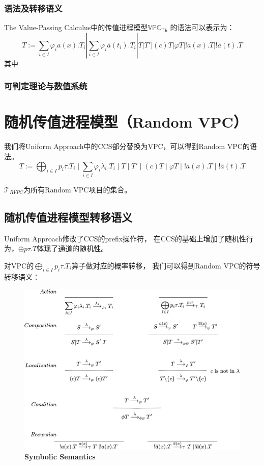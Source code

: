\subsubsection{语法及转移语义}
The Value-Passing Calculus中的传值进程模型$\mathbb{VPC}_{\mathsf{Th}}$
的语法可以表示为：
$$T:=\sum_{i\in I}\varphi_i a(x).T_i|\sum_{i\in I}\varphi_i\overline{a}(t_i).T_i|T|T'|(c)T|\varphi T|!a(x).T|!\overline{a}(t).T$$
其中
\subsubsection{可判定理论与数值系统}

\section{随机传值进程模型（Random VPC）}
我们将Uniform Approach中的CCS部分替换为VPC，可以得到Random VPC的语法。
$$T:=\bigoplus_{i\in I}p_i \tau.T_i\mid \sum_{i\in I} \varphi_i\lambda_i.T_i\mid T \mid T'\mid (c)T\mid \varphi T\mid !a(x).T \mid !\bar{a}(t).T$$

$\mathcal{T}_{RVPC}$为所有Random VPC项目的集合。

\subsection{随机传值进程模型转移语义}
Uniform Approach修改了CCS的prefix操作符，
在CCS的基础上增加了随机性行为，$\oplus p\tau.T$体现了通道的随机性。

对VPC的$\bigoplus_{i\in I}p_i \tau.T_i$算子做对应的概率转移，
我们可以得到Random VPC的符号转移语义：

\begin{figure}[!htbp]
	\small
	\centering
	\includegraphics[width=13cm]{../figure/symbolic_sematic.png}
    \caption{\textbf{Symbolic Semantics}}
    \label{fig_sematic}
\end{figure}

